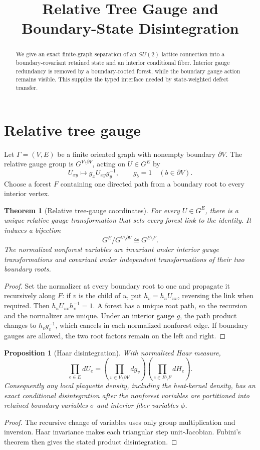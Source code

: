 \documentclass[11pt]{article}
\title{Relative Tree Gauge and Boundary-State Disintegration}
\author{}
\date{}
\newtheorem{theorem}{Theorem}
\newtheorem{proposition}{Proposition}
\begin{document}
\maketitle

\begin{abstract}
We give an exact finite-graph separation of an $SU(2)$ lattice connection into
a boundary-covariant retained state and an interior conditional fiber.
Interior gauge redundancy is removed by a boundary-rooted forest, while the
boundary gauge action remains visible.  This supplies the typed interface
needed by state-weighted defect transfer.
\end{abstract}

\section{Relative tree gauge}
Let $\Gamma=(V,E)$ be a finite oriented graph with nonempty boundary
$\partial V$.  The relative gauge group is $G^{V\setminus\partial V}$, acting
on $U\in G^E$ by
\[
 U_{xy}\longmapsto g_xU_{xy}g_y^{-1},\qquad g_b=1
 \quad(b\in\partial V).
\]
Choose a forest $F$ containing one directed path from a boundary root to every
interior vertex.

\begin{theorem}[Relative tree-gauge coordinates]
For every $U\in G^E$, there is a unique relative gauge transformation that
sets every forest link to the identity.  It induces a bijection
\[
 G^E/G^{V\setminus\partial V}\cong G^{E\setminus F}.
\]
The normalized nonforest variables are invariant under interior gauge
transformations and covariant under independent transformations of their two
boundary roots.
\end{theorem}
\begin{proof}
Set the normalizer at every boundary root to one and propagate it recursively
along $F$: if $v$ is the child of $u$, put $h_v=h_uU_{uv}$, reversing the link
when required.  Then $h_uU_{uv}h_v^{-1}=1$.  A forest has a unique root path,
so the recursion and the normalizer are unique.  Under an interior gauge
$g$, the path product changes to $h_vg_v^{-1}$, which cancels in each
normalized nonforest edge.  If boundary gauges are allowed, the two root
factors remain on the left and right.
\end{proof}

\begin{proposition}[Haar disintegration]
With normalized Haar measure,
\[
 \prod_{e\in E}dU_e
 =\left(\prod_{v\in V\setminus\partial V}dg_v\right)
   \left(\prod_{e\in E\setminus F}dH_e\right).
\]
Consequently any local plaquette density, including the heat-kernel density,
has an exact conditional disintegration after the nonforest variables are
partitioned into retained boundary variables $\sigma$ and interior fiber
variables $\phi$.
\end{proposition}
\begin{proof}
The recursive change of variables uses only group multiplication and
inversion.  Haar invariance makes each triangular step unit-Jacobian.  Fubini's
theorem then gives the stated product disintegration.
\end{proof}
\end{document}
